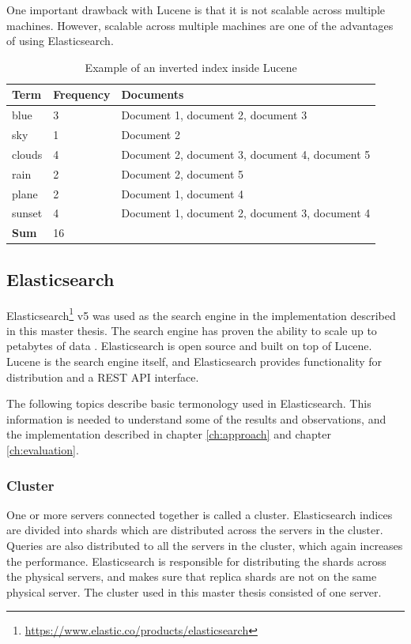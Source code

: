 One important drawback with Lucene is that it is not scalable across multiple machines.
However, scalable across multiple machines are one of the advantages of using Elasticsearch.

\begin{table}[h]
    \centering
    \begin{tabular}{l|l|l}
    Term   & Frequency & Documents                                                 \\ \hline
    blue   & 3         & Document 1, document 2, document 3                        \\
    sky    & 1         & Document 2                                                \\
    clouds & 4         & Document 2, document 3, document 4, document 5            \\
    rain   & 2         & Document 2, document 5                                    \\
    plane  & 2         & Document 1, document 4                                    \\
    sunset & 4         & Document 1, document 2, document 3, document 4            \\ \hline
    \textbf{Sum} & 16  &                                                           \\
    \end{tabular}
    \caption{Example of an inverted index inside Lucene}
    \label{tbl:inverted-index}
\end{table}


\subsection{Elasticsearch}
Elasticsearch\footnote{\url{https://www.elastic.co/products/elasticsearch}} v5 was used as the search engine in the implementation described in this master thesis.
The search engine has proven the ability to scale up to petabytes of data \cite{elasticsearch-scale}.
Elasticsearch is open source and built on top of Lucene.
Lucene is the search engine itself,
and Elasticsearch provides functionality for distribution and a REST API interface.

The following topics describe basic termonology used in Elasticsearch.
This information is needed to understand some of the results and observations,
and the implementation described in chapter \ref{ch:approach} and chapter \ref{ch:evaluation}.

\subsubsection{Cluster}
One or more servers connected together is called a cluster.
Elasticsearch indices are divided into shards which are distributed across the servers in the cluster.
Queries are also distributed to all the servers in the cluster, which again increases the performance.
Elasticsearch is responsible for distributing the shards across the physical servers,
and makes sure that replica shards are not on the same physical server.
The cluster used in this master thesis consisted of one server.

